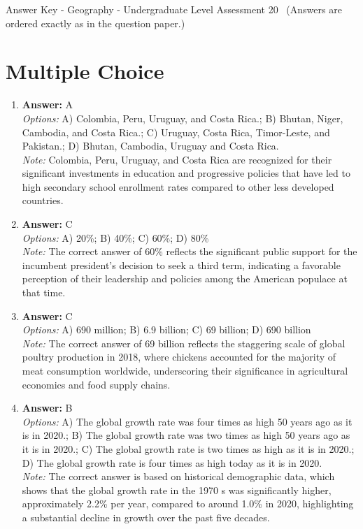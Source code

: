 \documentclass[12pt]{article}
\begin{document}
\begin{center}
Answer Key - Geography - Undergraduate Level Assessment 20 \
\small (Answers are ordered exactly as in the question paper.)
\end{center}

\section*{Multiple Choice}
\begin{enumerate}[label=\arabic*.]
\item \textbf{Answer:} A
\\ \textit{Options:} A) Colombia, Peru, Uruguay, and Costa Rica.; B) Bhutan, Niger, Cambodia, and Costa Rica.; C) Uruguay, Costa Rica, Timor-Leste, and Pakistan.; D) Bhutan, Cambodia, Uruguay and Costa Rica.
\\ \textit{Note:} Colombia, Peru, Uruguay, and Costa Rica are recognized for their significant investments in education and progressive policies that have led to high secondary school enrollment rates compared to other less developed countries.
\item \textbf{Answer:} C
\\ \textit{Options:} A) 20\%; B) 40\%; C) 60\%; D) 80\%
\\ \textit{Note:} The correct answer of 60\% reflects the significant public support for the incumbent president's decision to seek a third term, indicating a favorable perception of their leadership and policies among the American populace at that time.
\item \textbf{Answer:} C
\\ \textit{Options:} A) 690 million; B) 6.9 billion; C) 69 billion; D) 690 billion
\\ \textit{Note:} The correct answer of 69 billion reflects the staggering scale of global poultry production in 2018, where chickens accounted for the majority of meat consumption worldwide, underscoring their significance in agricultural economics and food supply chains.
\item \textbf{Answer:} B
\\ \textit{Options:} A) The global growth rate was four times as high 50 years ago as it is in 2020.; B) The global growth rate was two times as high 50 years ago as it is in 2020.; C) The global growth rate is two times as high as it is in 2020.; D) The global growth rate is four times as high today as it is in 2020.
\\ \textit{Note:} The correct answer is based on historical demographic data, which shows that the global growth rate in the 1970 s was significantly higher, approximately 2.2\% per year, compared to around 1.0\% in 2020, highlighting a substantial decline in growth over the past five decades.

\end{enumerate}
\end{document}
